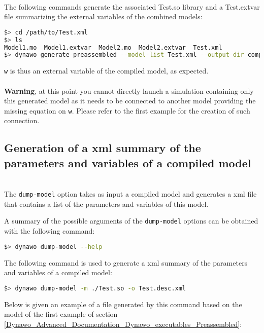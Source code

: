 \documentclass[a4paper, 12pt]{report}
\begin{document}
 ~~\\
The following commands generate the associated Test.so library and a Test.extvar file summarizing the external variables of the combined models:
\begin{lstlisting}[language=bash,deletekeywords={jobs,help}]
$> cd /path/to/Test.xml
$> ls
Model1.mo  Model1.extvar  Model2.mo  Model2.extvar  Test.xml
$> dynawo generate-preassembled --model-list Test.xml --output-dir compilation --non-recursive-modelica-models-dir .
\end{lstlisting}


\lstinline[language=Modelica]{w} is thus an external variable of the compiled model, as expected. \\
~~\\
\textbf{Warning}, at this point you cannot directly launch a simulation containing only this generated model as it needs to be connected to another model providing the missing equation on \lstinline[language=Modelica]{w}. Please refer to the first example for the creation of such connection.

\subsection{Generation of a xml summary of the parameters and variables of a compiled model}
~~\\
The \lstinline[language=bash]{dump-model} option takes as input a compiled \Dynawo model and generates a xml file that contains a list of the parameters and variables of this model.

A summary of the possible arguments of the \lstinline[language=bash]{dump-model} options can be obtained with the following command:
\begin{lstlisting}[language=bash,deletekeywords={jobs,help}]
$> dynawo dump-model --help
\end{lstlisting}

The following command is used to generate a xml summary of the parameters and variables of a compiled model:
\begin{lstlisting}[language=bash,deletekeywords={jobs,help}]
$> dynawo dump-model -m ./Test.so -o Test.desc.xml
\end{lstlisting}

Below is given an example of a file generated by this command based on the model of the first example of section \ref{Dynawo_Advanced_Documentation_Dynawo_executables_Preassembled}:

\end{document}

